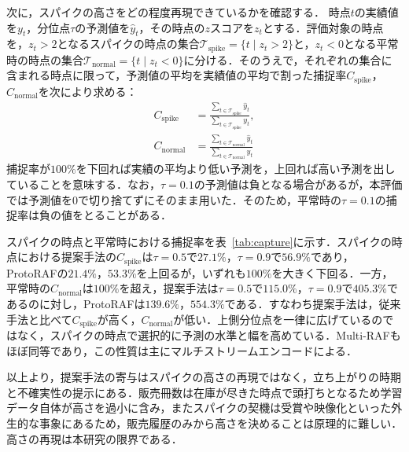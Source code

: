 \documentclass[twocolumn, lastpage]{jarticle}
\newif\ifrevmark
\newcommand{\revA}[1]{\ifrevmark{\color{blue}#1}\else#1\fi}
\newcommand{\revAblock}[1]{\ifrevmark{\color{blue}#1}\else#1\fi}
\begin{document}
\revAblock{次に，スパイクの高さをどの程度再現できているかを確認する．
時点$t$の実績値を$y_t$，分位点$\tau$の予測値を$\hat{y}_t$，その時点の$z$スコアを$z_t$とする．評価対象の時点を，$z_t > 2$となるスパイクの時点の集合$\mathcal{T}_{\mathrm{spike}} = \{t \mid z_t > 2\}$と，$z_t < 0$となる平常時の時点の集合$\mathcal{T}_{\mathrm{normal}} = \{t \mid z_t < 0\}$に分ける．そのうえで，それぞれの集合に含まれる時点に限って，予測値の平均を実績値の平均で割った捕捉率$C_{\mathrm{spike}}$，$C_{\mathrm{normal}}$を次により求める：
    \begin{equation}\label{eq:capture}
        \begin{aligned}
            C_{\mathrm{spike}} &= \frac{\sum_{t \in \mathcal{T}_{\mathrm{spike}}} \hat{y}_t}{\sum_{t \in \mathcal{T}_{\mathrm{spike}}} y_t}, \\[6pt]
            C_{\mathrm{normal}} &= \frac{\sum_{t \in \mathcal{T}_{\mathrm{normal}}} \hat{y}_t}{\sum_{t \in \mathcal{T}_{\mathrm{normal}}} y_t}
        \end{aligned}
    \end{equation}
捕捉率が$100\%$を下回れば実績の平均より低い予測を，上回れば高い予測を出していることを意味する．なお，$\tau=0.1$の予測値は負となる場合があるが，本評価では予測値を$0$で切り捨てずにそのまま用いた．そのため，平常時の$\tau=0.1$の捕捉率は負の値をとることがある．

スパイクの時点と平常時における捕捉率を表~\ref{tab:capture}に示す．スパイクの時点における提案手法の$C_{\mathrm{spike}}$は$\tau=0.5$で$27.1\%$，$\tau=0.9$で$56.9\%$であり，ProtoRAFの$21.4\%$，$53.3\%$を上回るが，いずれも$100\%$を大きく下回る．一方，平常時の$C_{\mathrm{normal}}$は$100\%$を超え，提案手法は$\tau=0.5$で$115.0\%$，$\tau=0.9$で$405.3\%$であるのに対し，ProtoRAFは$139.6\%$，$554.3\%$である．すなわち提案手法は，従来手法と比べて$C_{\mathrm{spike}}$が高く，$C_{\mathrm{normal}}$が低い．上側分位点を一律に広げているのではなく，スパイクの時点で選択的に予測の水準と幅を高めている．Multi-RAFもほぼ同等であり，この性質は主にマルチストリームエンコードによる．}

\revA{以上より，提案手法の寄与はスパイクの高さの再現ではなく，立ち上がりの時期と不確実性の提示にある．販売冊数は在庫が尽きた時点で頭打ちとなるため学習データ自体が高さを過小に含み，またスパイクの契機は受賞や映像化といった外生的な事象にあるため，販売履歴のみから高さを決めることは原理的に難しい．高さの再現は本研究の限界である．}
\end{document}
